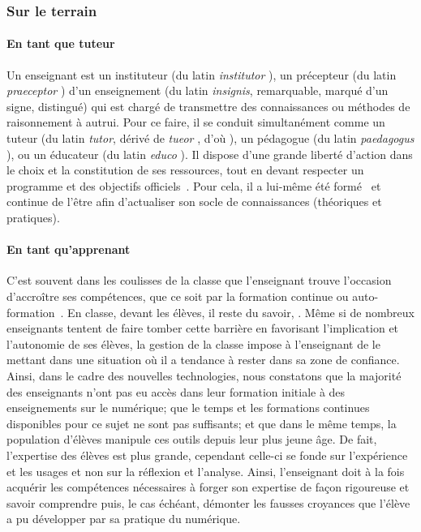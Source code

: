        \subsubsection{Sur le terrain}
            \paragraph{En tant que tuteur}
                Un enseignant est un instituteur (du latin \textit{institutor} ), un précepteur (du latin \textit{praeceptor} ) d'un enseignement (du latin \textit{insignis}, remarquable, marqué d'un signe, distingué) qui est chargé de transmettre des connaissances ou méthodes de raisonnement à autrui. Pour ce faire, il se conduit simultanément comme un tuteur (du latin \textit{tutor}, dérivé de \textit{tueor} , d’où  ), un pédagogue (du latin \textit{paedagogus} ), ou un éducateur (du latin \textit{educo} ). Il dispose d'une grande liberté d'action dans le choix et la constitution de ses ressources, tout en devant respecter un programme et des objectifs officiels~. Pour cela, il a lui-même été formé~ et continue de l'être afin d'actualiser son socle de connaissances (théoriques et pratiques).
            \paragraph{En tant qu'apprenant}
                C'est souvent dans les coulisses de la classe que l'enseignant trouve l'occasion d'accroître ses compétences, que ce soit par la formation continue ou auto-formation~. En classe, devant les élèves, il reste  du savoir, . Même si de nombreux enseignants tentent de faire tomber cette barrière en favorisant l'implication et l'autonomie de ses élèves, la gestion de la classe impose à l'enseignant de  le mettant dans une situation où il a tendance à rester dans sa zone de confiance. Ainsi, dans le cadre des nouvelles technologies, nous constatons que la majorité des enseignants n'ont pas eu accès dans leur formation initiale à des enseignements sur le numérique; que le temps et les formations continues disponibles pour ce sujet ne sont pas suffisants; et que dans le même temps, la population d'élèves manipule ces outils depuis leur plus jeune âge. De fait, l'expertise des élèves est plus grande, cependant celle-ci se fonde sur l'expérience et les usages et non sur la réflexion et l'analyse. Ainsi, l'enseignant doit à la fois acquérir les compétences nécessaires à forger son expertise de façon rigoureuse et savoir comprendre puis, le cas échéant, démonter les fausses croyances que l'élève a pu développer par sa pratique du numérique.
